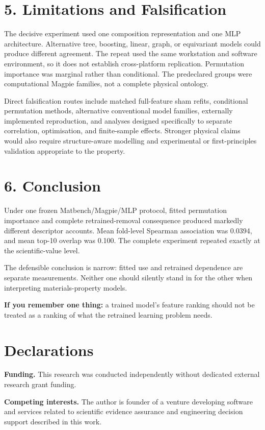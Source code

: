 \documentclass[10pt,a4paper]{article}
\begin{document}
\section{5. Limitations and Falsification}
The decisive experiment used one composition representation and one MLP architecture. Alternative tree, boosting, linear, graph, or equivariant models could produce different agreement. The repeat used the same workstation and software environment, so it does not establish cross-platform replication. Permutation importance was marginal rather than conditional. The predeclared groups were computational Magpie families, not a complete physical ontology.

Direct falsification routes include matched full-feature sham refits, conditional permutation methods, alternative conventional model families, externally implemented reproduction, and analyses designed specifically to separate correlation, optimisation, and finite-sample effects. Stronger physical claims would also require structure-aware modelling and experimental or first-principles validation appropriate to the property.

\section{6. Conclusion}
Under one frozen Matbench/Magpie/MLP protocol, fitted permutation importance and complete retrained-removal consequence produced markedly different descriptor accounts. Mean fold-level Spearman association was 0.0394, and mean top-10 overlap was 0.100. The complete experiment repeated exactly at the scientific-value level.

The defensible conclusion is narrow: fitted use and retrained dependence are separate measurements. Neither one should silently stand in for the other when interpreting materials-property models.

\textbf{If you remember one thing:} a trained model's feature ranking should not be treated as a ranking of what the retrained learning problem needs.

\section*{Declarations}
\textbf{Funding.} This research was conducted independently without dedicated external research grant funding.

\textbf{Competing interests.} The author is founder of a venture developing software and services related to scientific evidence assurance and engineering decision support described in this work.
\end{document}
